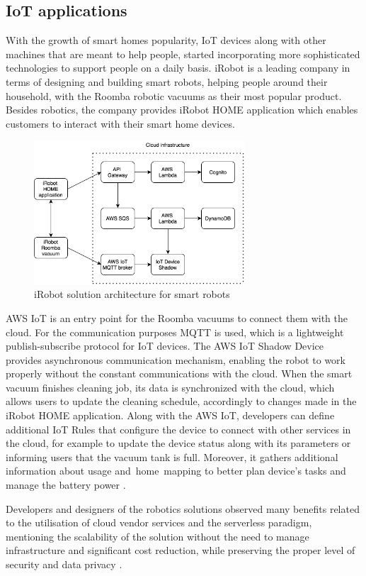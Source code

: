\subsection{IoT applications}

With the growth of smart homes popularity, IoT devices along with other machines that are meant to help people, started incorporating more sophisticated technologies to support people on a daily basis. iRobot is a leading company in terms of designing and building smart robots, helping people around their household, with the Roomba robotic vacuums as their most popular product. Besides robotics, the company provides iRobot HOME application which enables customers to interact with their smart home devices.

\begin{figure}[h]
    \centering
    \includegraphics[width=0.7\textwidth]{assets/02-serverless/iRobotArchitecture.png}
    \caption{iRobot solution architecture for smart robots}
    \label{fig:irobot-architecture-diagram}
\end{figure}

AWS IoT is an entry point for the Roomba vacuums to connect them with the cloud. For the communication purposes MQTT is used, which is a lightweight publish-subscribe protocol for IoT devices. The AWS IoT Shadow Device provides asynchronous communication mechanism, enabling the robot to work properly without the constant communications with the cloud. When the smart vacuum finishes cleaning job, its data is synchronized with the cloud, which allows users to update the cleaning schedule, accordingly to changes made in the iRobot HOME application. Along with the AWS IoT, developers can define additional IoT Rules that configure the device to connect with other services in the cloud, for example to update the device status along with its parameters or informing users that the vacuum tank is full. Moreover, it gathers additional information about usage and~home~mapping to better plan device's tasks and manage the battery power \cite{ServerlessIoTatiRobot}.

Developers and designers of the robotics solutions observed many benefits related to the utilisation of cloud vendor services and the serverless paradigm, mentioning the scalability of the solution without the need to manage infrastructure and significant cost reduction, while preserving the proper level of security and data privacy \cite{AWSIRobotIoT}.